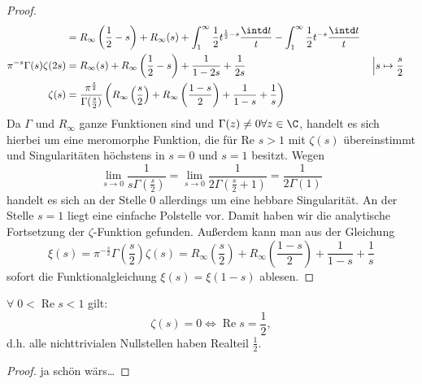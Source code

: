 \documentclass{article}
\renewcommand{\Re}{\operatorname{Re}}
\begin{document}
\begin{proof}
\begin{align*}
    &= R_\infty\left(\frac{1}{2}-s\right) + R_\infty(s) + \int_1^\infty \frac{1}{2}t^{\frac{1}{2}-s} \frac{\intd t}{t} - \int_1^{\infty} \frac{1}{2} t^{-s} \frac{\intd t}{t} \\
    \pi^{-s} \Gamma(s)\zeta(2s)&= R_\infty(s) + R_\infty\left(\frac{1}{2}-s\right) + \frac{1}{1-2s} + \frac{1}{2s}&&\left|s\mapsto \frac{s}{2}\right.\\
    \zeta(s) &= \frac{\pi^\frac{s}{2}}{\Gamma(\frac{s}{2})} \left(R_\infty\left(\frac{s}{2}\right) +R_\infty\left(\frac{1-s}{2}\right) + \frac{1}{1-s} + \frac{1}{s} \right)
\end{align*}
Da $\Gamma$ und $R_\infty$ ganze Funktionen sind und $\Gamma(z) \neq 0 \forall z\in \C$, handelt es sich hierbei um eine meromorphe Funktion, die für Re $s > 1$ mit $\zeta(s)$ übereinstimmt und Singularitäten höchstens in $s = 0$ und $s = 1$ besitzt. Wegen 
\[\lim\limits_{s \to 0}\frac{1}{s\Gamma\left(\frac{s}{2}\right)} = \lim\limits_{s \to 0} \frac{1}{2\Gamma\left(\frac{s}{2} + 1\right)} = \frac{1}{2\Gamma(1)}\]
handelt es sich an der Stelle $0$ allerdings um eine hebbare Singularität. An der Stelle $s = 1$ liegt eine einfache Polstelle vor. Damit haben wir die analytische Fortsetzung der $\zeta$-Funktion gefunden.
Außerdem kann man aus der Gleichung 
\[
    \xi(s) = \pi^{-\frac{s}{2}} \Gamma\left(\frac{s}{2}\right)\zeta(s) = R_\infty\left(\frac{s}{2}\right) +R_\infty\left(\frac{1-s}{2}\right) + \frac{1}{1-s} + \frac{1}{s}
\]
sofort die Funktionalgleichung $\xi(s) = \xi(1-s)$ ablesen.
\end{proof}

\begin{lemma}
    $\forall\; 0 < \Re s < 1$ gilt:
    \[
        \zeta(s) = 0 \Leftrightarrow \Re s = \frac{1}{2},  
    \] d.h. alle nichttrivialen Nullstellen haben Realteil $\frac{1}{2}$.
\end{lemma}
\begin{proof}
    ja schön wärs\dots
\end{proof}
\end{document}
